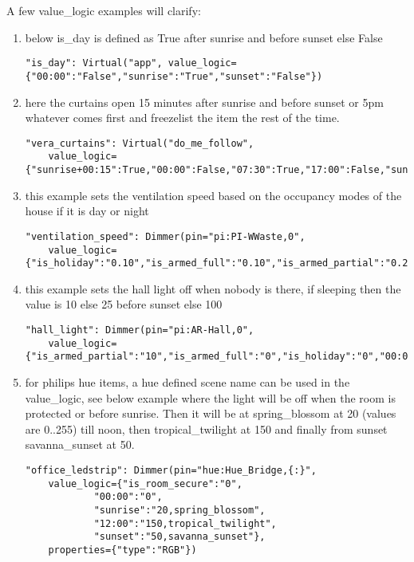 A few value\_logic examples will clarify:

\begin{enumerate}
\def\labelenumi{\arabic{enumi}.}
\item
  below is\_day is defined as True after sunrise and before sunset else
  False

\begin{verbatim}
"is_day": Virtual("app", value_logic={"00:00":"False","sunrise":"True","sunset":"False"})
\end{verbatim}
\item
  here the curtains open 15 minutes after sunrise and before sunset or
  5pm whatever comes first and freezelist the item the rest of the time.

\begin{verbatim}
"vera_curtains": Virtual("do_me_follow", 
    value_logic={"sunrise+00:15":True,"00:00":False,"07:30":True,"17:00":False,"sunset":False})
\end{verbatim}
\item
  this example sets the ventilation speed based on the occupancy modes
  of the house if it is day or night

\begin{verbatim}
"ventilation_speed": Dimmer(pin="pi:PI-WWaste,0", 
    value_logic={"is_holiday":"0.10","is_armed_full":"0.10","is_armed_partial":"0.20","is_day":"0.50"})
\end{verbatim}
\item
  this example sets the hall light off when nobody is there, if sleeping
  then the value is 10 else 25 before sunset else 100

\begin{verbatim}
"hall_light": Dimmer(pin="pi:AR-Hall,0", 
    value_logic={"is_armed_partial":"10","is_armed_full":"0","is_holiday":"0","00:00":"25","sunset":"100"})
\end{verbatim}
\item
  for philips hue items, a hue defined scene name can be used in the
  value\_logic, see below example where the light will be off when the
  room is protected or before sunrise. Then it will be at
  spring\_blossom at 20 (values are 0..255) till noon, then
  tropical\_twilight at 150 and finally from sunset savanna\_sunset at
  50.

\begin{verbatim}
"office_ledstrip": Dimmer(pin="hue:Hue_Bridge,{:}",
    value_logic={"is_room_secure":"0",
            "00:00":"0",
            "sunrise":"20,spring_blossom",
            "12:00":"150,tropical_twilight",
            "sunset":"50,savanna_sunset"}, 
    properties={"type":"RGB"})
\end{verbatim}
\end{enumerate}

